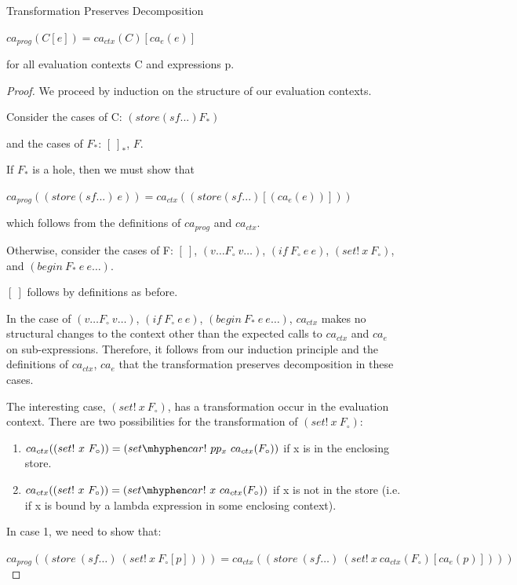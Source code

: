 \begin{lemma}\label{lem:trans_decomp} Transformation Preserves Decomposition

$ca_{prog}(C[e]) = ca_{ctx}(C)[ca_e(e)]$

for all evaluation contexts C and expressions p.

\end{lemma}
\begin{proof} We proceed by induction on the structure of our evaluation contexts.

Consider the cases of C: $(store (sf ...) F_{*})$

and the cases of $F_{*}$: $[\ ]_{*}$, $F$.

If $F_{*}$ is a hole, then we must show that 

$ca_{prog}((store (sf ...)\ e)) = ca_{ctx}((store (sf ...) [(ca_{e}(e))]))$

which follows from the definitions of $ca_{prog}$ and $ca_{ctx}$.

Otherwise, consider the cases of F: $[\ ]$, $(v \dots F_{\circ}\ v \dots)$, $(if\ F_{\circ}\ e\ e)$, $(set!\ x\ F_{\circ})$, and $(begin\ F_{*}\ e\ e \dots)$.

$[\ ]$ follows by definitions as before. 

In the case of  $(v \dots F_{\circ}\ v \dots)$, $(if\ F_{\circ}\ e\ e)$, $(begin\ F_{*}\ e\ e \dots)$, $ca_{ctx}$ makes no structural changes to the context other than the expected calls to $ca_{ctx}$ and $ca_e$ on sub-expressions. Therefore, it follows from our induction principle and the definitions of $ca_{ctx}$, $ca_e$ that the transformation preserves decomposition in these cases.

The interesting case, $(set!\ x\ F_{\circ})$, has a transformation occur in the evaluation context. There are two possibilities for the transformation of $(set!\ x\ F_{\circ})$:

\begin{enumerate}
    \item $ca_{ctx}((set!\ x\ F_{\circ})) = (set \mhyphen car!\ pp_x\ ca_{ctx}(F_{\circ}))$ if x is in the enclosing store.
    \item $ca_{ctx}((set!\ x\ F_{\circ})) = (set \mhyphen car!\ x\ ca_{ctx}(F_{\circ}))$ if x is not in the store (i.e. if x is bound by a lambda expression in some enclosing context).
\end{enumerate}

In case 1, we need to show that:

$ca_{prog}((store\ (sf \dots)\ (set!\ x\ F_{\circ}[p]))) = ca_{ctx}((store\ (sf \dots)\ (set!\ x\ ca_{ctx}(F_{\circ})[ca_e(p)])))$


\end{proof}
